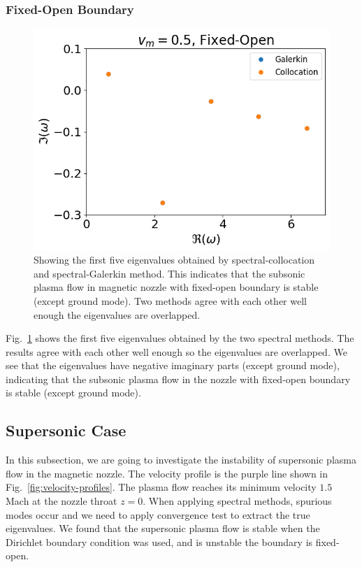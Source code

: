 \subsubsection*{Fixed-Open Boundary}
\begin{figure} [htbp!]
	\centering
	\includegraphics[width=0.7\linewidth]{figures/subsonic-fixed-open.png}
	\caption{Showing the first five eigenvalues obtained by spectral-collocation and spectral-Galerkin method. This indicates that the subsonic plasma flow in magnetic nozzle with fixed-open boundary is stable (except ground mode). Two methods agree with each other well enough the eigenvalues are overlapped.}
	\label{fig:subsonic-fixed-open}
\end{figure}
Fig.~\ref{fig:subsonic-fixed-open} shows the first five eigenvalues obtained by the two spectral methods. The results agree with each other well enough so the eigenvalues are overlapped. We see that the eigenvalues have negative imaginary parts (except ground mode), indicating that the subsonic plasma flow in the nozzle with fixed-open boundary is stable (except ground mode).

\subsection{Supersonic Case}
In this subsection, we are going to investigate the instability of supersonic plasma flow in the magnetic nozzle. The velocity profile is the purple line shown in Fig.~\ref{fig:velocity-profiles}. The plasma flow reaches its minimum velocity $1.5$ Mach at the nozzle throat $z=0$. When applying spectral methods, spurious modes occur and we need to apply convergence test to extract the true eigenvalues. We found that the supersonic plasma flow is stable when the Dirichlet boundary condition was used, and is unstable the boundary is fixed-open.

